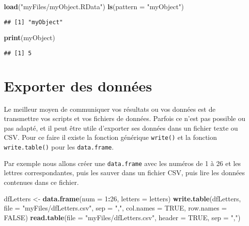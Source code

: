 \documentclass[]{book}
\newenvironment{Shaded}{\begin{snugshade}}{\end{snugshade}}
\newcommand{\KeywordTok}[1]{\textcolor[rgb]{0.13,0.29,0.53}{\textbf{#1}}}
\newcommand{\DataTypeTok}[1]{\textcolor[rgb]{0.13,0.29,0.53}{#1}}
\newcommand{\DecValTok}[1]{\textcolor[rgb]{0.00,0.00,0.81}{#1}}
\newcommand{\StringTok}[1]{\textcolor[rgb]{0.31,0.60,0.02}{#1}}
\newcommand{\OtherTok}[1]{\textcolor[rgb]{0.56,0.35,0.01}{#1}}
\newcommand{\OperatorTok}[1]{\textcolor[rgb]{0.81,0.36,0.00}{\textbf{#1}}}
\newcommand{\NormalTok}[1]{#1}
\theoremstyle{definition}
\theoremstyle{definition}
\theoremstyle{definition}
\theoremstyle{remark}
\begin{document}
\begin{Shaded}
\begin{Highlighting}[]
\KeywordTok{load}\NormalTok{(}\StringTok{"myFiles/myObject.RData"}\NormalTok{)}
\KeywordTok{ls}\NormalTok{(}\DataTypeTok{pattern =} \StringTok{"myObject"}\NormalTok{)}
\end{Highlighting}
\end{Shaded}

\begin{verbatim}
## [1] "myObject"
\end{verbatim}

\begin{Shaded}
\begin{Highlighting}[]
\KeywordTok{print}\NormalTok{(myObject)}
\end{Highlighting}
\end{Shaded}

\begin{verbatim}
## [1] 5
\end{verbatim}

\section{Exporter des données}\label{l016write}

Le meilleur moyen de communiquer vos résultats ou vos données est de
transmettre vos scripts et vos fichiers de données. Parfois ce n'est pas
possible ou pas adapté, et il peut être utile d'exporter ses données
dans un fichier texte ou CSV. Pour ce faire il existe la fonction
générique \texttt{write()} et la fonction \texttt{write.table()} pour
les \texttt{data.frame}.

Par exemple nous allons créer une \texttt{data.frame} avec les numéros
de 1 à 26 et les lettres correspondantes, puis les sauver dans un
fichier CSV, puis lire les données contenues dans ce fichier.

\begin{Shaded}
\begin{Highlighting}[]
\NormalTok{dfLetters <-}\StringTok{ }\KeywordTok{data.frame}\NormalTok{(}\DataTypeTok{num =} \DecValTok{1}\OperatorTok{:}\DecValTok{26}\NormalTok{, }\DataTypeTok{letters =}\NormalTok{ letters)}
\KeywordTok{write.table}\NormalTok{(dfLetters, }\DataTypeTok{file =} \StringTok{"myFiles/dfLetters.csv"}\NormalTok{, }
  \DataTypeTok{sep =} \StringTok{","}\NormalTok{, }\DataTypeTok{col.names =} \OtherTok{TRUE}\NormalTok{, }\DataTypeTok{row.names =} \OtherTok{FALSE}\NormalTok{)}
\KeywordTok{read.table}\NormalTok{(}\DataTypeTok{file =} \StringTok{"myFiles/dfLetters.csv"}\NormalTok{, }\DataTypeTok{header =} \OtherTok{TRUE}\NormalTok{, }\DataTypeTok{sep =} \StringTok{","}\NormalTok{)}
\end{Highlighting}
\end{Shaded}
\end{document}
